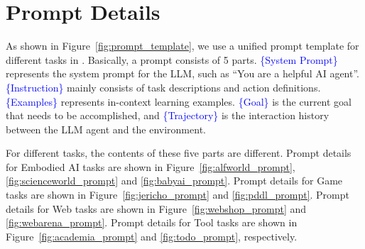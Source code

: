 \section{Prompt Details \label{appendix:prompt}}
As shown in Figure~\ref{fig:prompt_template},
we use a unified prompt template for different tasks in \BenchName{}.
Basically, a prompt consists of 5 parts.
\textcolor{blue}{\{System Prompt\}} represents the system prompt for the LLM, such as ``You are a helpful AI agent''.
\textcolor{blue}{\{Instruction\}} mainly consists of task descriptions and action definitions.
\textcolor{blue}{\{Examples\}} represents in-context learning examples.
\textcolor{blue}{\{Goal\}} is the current goal that needs to be accomplished, and \textcolor{blue}{\{Trajectory\}} is the interaction history between the LLM agent and the environment.

For different tasks, the contents of these five parts are different.
Prompt details for Embodied AI tasks are shown in Figure~\ref{fig:alfworld_prompt}, \ref{fig:scienceworld_prompt} and \ref{fig:babyai_prompt}.
Prompt details for Game tasks are shown in Figure~\ref{fig:jericho_prompt} and \ref{fig:pddl_prompt}.
Prompt details for Web tasks are shown in Figure~\ref{fig:webshop_prompt} and \ref{fig:webarena_prompt}.
Prompt details for Tool tasks are shown in Figure~\ref{fig:academia_prompt} and \ref{fig:todo_prompt}, respectively.








% 
% 


% 